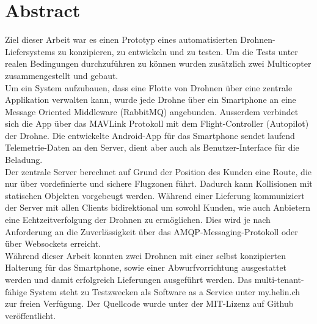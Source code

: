 \newpage
{}
\chapter*{Abstract}
Ziel dieser Arbeit war es einen Prototyp eines automatisierten Drohnen-Liefersystems zu konzipieren, zu entwickeln und zu testen. Um die Tests unter realen Bedingungen durchzuführen zu können wurden zusätzlich zwei Multicopter zusammengestellt und gebaut.\\

Um ein System aufzubauen, dass eine Flotte von Drohnen über eine zentrale Applikation verwalten kann, wurde jede Drohne über ein Smartphone an eine Message Oriented Middleware (RabbitMQ) angebunden. Ausserdem verbindet sich die App über das \Gls{MAVLink} Protokoll mit dem \Gls{Flight-Controller} (Autopilot) der Drohne. Die entwickelte Android-App für das Smartphone sendet laufend Telemetrie-Daten an den Server, dient aber auch als Benutzer-Interface für die Beladung. \\

Der zentrale Server berechnet auf Grund der Position des Kunden eine Route, die nur über vordefinierte und sichere Flugzonen führt. Dadurch kann Kollisionen mit statischen Objekten vorgebeugt werden. Während einer Lieferung kommuniziert der Server mit allen Clients bidirektional um sowohl Kunden, wie auch Anbietern eine Echtzeitverfolgung der Drohnen zu ermöglichen. Dies wird je nach Anforderung an die Zuverlässigkeit über das AMQP-Messaging-Protokoll oder über Websockets erreicht.  \\

Während dieser Arbeit konnten zwei Drohnen mit einer selbst konzipierten Halterung für das Smartphone, sowie einer Abwurfvorrichtung ausgestattet werden und damit erfolgreich Lieferungen ausgeführt werden. Das multi-tenant-fähige System steht zu Testzwecken als Software as a Service unter my.helin.ch zur freien Verfügung. Der Quellcode wurde unter der MIT-Lizenz auf Github veröffentlicht.




